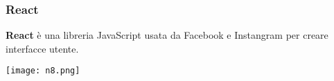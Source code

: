 \begin{frame}
\frametitle{React}
	\par
  	\textbf{React} è una libreria JavaScript usata da Facebook e Instangram per creare interfacce utente.\\
	\begin{flushleft}
		\texttt{[image: n8.png]}
	\end{flushleft}
\end{frame}


